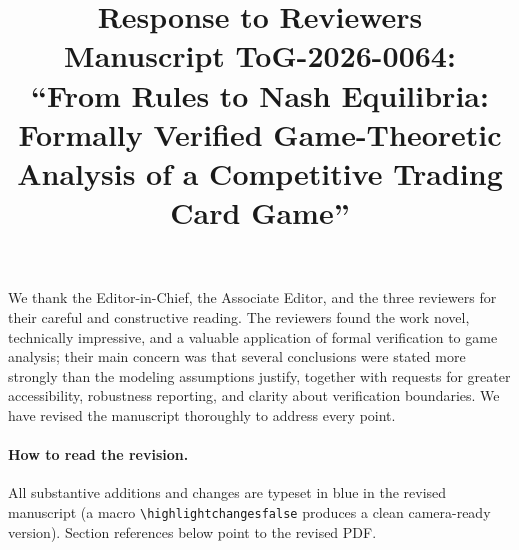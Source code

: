 \documentclass[11pt]{article}
\title{Response to Reviewers\\\large Manuscript ToG-2026-0064:\\``From Rules to Nash Equilibria: Formally Verified Game-Theoretic\\Analysis of a Competitive Trading Card Game''}
\author{}
\date{}
\newcommand{\rev}[1]{\textcolor{blue!70!black}{#1}}
\begin{document}
\maketitle

We thank the Editor-in-Chief, the Associate Editor, and the three reviewers for
their careful and constructive reading. The reviewers found the work novel,
technically impressive, and a valuable application of formal verification to game
analysis; their main concern was that several conclusions were stated more
strongly than the modeling assumptions justify, together with requests for
greater accessibility, robustness reporting, and clarity about verification
boundaries. We have revised the manuscript thoroughly to address every point.

\paragraph{How to read the revision.} All substantive additions and changes are
typeset in \rev{blue} in the revised manuscript (a macro \verb|\highlightchangesfalse|
produces a clean camera-ready version). Section references below point to the
revised PDF.
\end{document}
